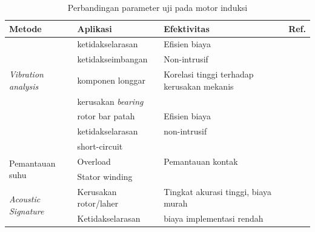 \documentclass{elsinta}
\begin{document}
\begin{table}[H]
\centering
\caption{Perbandingan parameter uji pada motor induksi}
\begin{tabular}{|p{3cm}|p{4cm}|p{4cm}|p{2cm}|}
\hline
\textbf{Metode} & \textbf{Aplikasi} & \textbf{Efektivitas} &\textbf{Ref.}\\ \hline

\multirow{5}{*}{\textit{Vibration analysis}}        & ketidakselarasan            & Efisien biaya                                 & \cite{Hassan2024,Pardeshi2022,Tsypkin2017} \\
                                                    & ketidakseimbangan         & Non-intrusif                                  & \\
                                                    & komponen longgar          & Korelasi tinggi terhadap kerusakan mekanis    & \\
                                                    & kerusakan \textit{bearing}&                                               & \\ \hline
\multirow{3}{*}{MCSA}                               & rotor bar patah       & Efisien biaya                 & \cite{Cameron1986, Sunal2022}\\
                                                    & ketidakselarasan      & non-intrusif                  & \\
                                                    & short-circuit         &                               & \\ \hline

\multirow{2}{*}{Pemantauan suhu}                    & Overload          & Pemantauan kontak   & \cite{Filho2025, Lee2002}\\
                                                    & Stator winding    &                     & \\ \hline


\multirow{3}{*}{\textit{Acoustic Signature}}        & Kerusakan rotor/laher & Tingkat akurasi tinggi, biaya murah   & \multirow{2}{*}{\cite{Venkatesh2022}}\\ 
                                                    & Ketidakselarasan      & biaya implementasi rendah             &\\ \hline 

\end{tabular}
\end{table}
\end{document}
